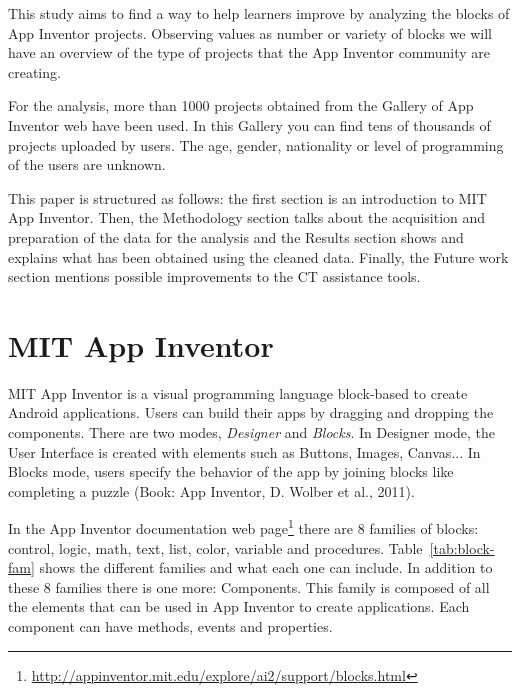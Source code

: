\documentclass[a4paper]{article}
\begin{document}
This study aims to find a way to help learners improve by analyzing the blocks of App Inventor projects. Observing values as number or variety of blocks we will have an overview of the type of projects that the App Inventor community are creating.

For the analysis, more than 1000 projects obtained from the Gallery of App Inventor web have been used. 
In this Gallery you can find tens of thousands of projects uploaded by users. The age, gender, nationality or level of programming of the users are unknown.

This paper is structured as follows: the first section is an introduction to MIT App Inventor. Then, the Methodology section talks about the acquisition and preparation of the data for the analysis and the Results section shows and explains what has been obtained using the cleaned data. Finally, the Future work section mentions possible improvements to the CT assistance tools.

\section{MIT App Inventor}
MIT App Inventor is a visual programming language block-based to create Android applications. Users can build their apps by dragging and dropping the components. There are two modes, \emph{Designer} and \emph{Blocks}. In Designer mode, the User Interface is created with elements such as Buttons, Images, Canvas... In Blocks mode, users specify the behavior of the app by joining blocks like completing a puzzle (Book: App Inventor, D. Wolber et al., 2011).

In the App Inventor documentation web page\footnote{\url{http://appinventor.mit.edu/explore/ai2/support/blocks.html}} there are 8 families of blocks: control, logic, math, text, list, color, variable and procedures. Table~\ref{tab:block-fam} shows the different families and what each one can include. In addition to these 8 families there is one more: Components. This family is composed of all the elements that can be used in App Inventor to create applications. Each component can have methods, events and properties.
\end{document}

